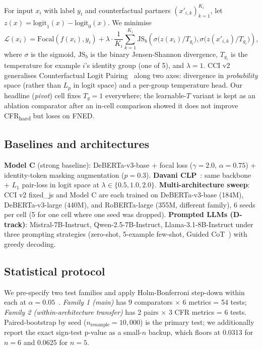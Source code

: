 \documentclass[10pt,a4paper]{article}
\begin{document}
For input $x_i$ with label $y_i$ and counterfactual partners $(x'_{i,k})_{k=1}^{K_i}$,
let $z(x) = \mathrm{logit}_1(x) - \mathrm{logit}_0(x)$. We minimise
\[
\mathcal{L}(x_i)=\text{Focal}(f(x_i), y_i)
+\lambda\cdot\frac{1}{K_i}\sum_{k=1}^{K_i}
\mathrm{JS}_b\!\left(\sigma\!\bigl(z(x_i)/T_{g_i}\bigr),
                     \sigma\!\bigl(z(x'_{i,k})/T_{g_i}\bigr)\right),
\]
where $\sigma$ is the sigmoid, $\mathrm{JS}_b$ is the binary Jensen-Shannon
divergence, $T_{g_i}$ is the temperature for example $i$'s identity group
(one of 5), and $\lambda{=}1$. CCI v2 generalises Counterfactual Logit
Pairing~\citep{garg2019counterfactual,davani2021improving} along two axes:
divergence in \emph{probability} space (rather than $L_p$ in logit space)
and a per-group temperature head. Our headline (\emph{pivot}) cell fixes
$T_g{=}1$ everywhere; the learnable-$T$ variant is kept as an ablation
comparator after an in-cell comparison showed it does not improve
CFR\textsubscript{hard} but loses on FNED.

\subsection{Baselines and architectures}

\textbf{Model C} (strong baseline): DeBERTa-v3-base + focal loss
($\gamma{=}2.0,\,\alpha{=}0.75$) + identity-token masking augmentation
($p{=}0.3$). \textbf{Davani CLP}~\citep{davani2021improving}: same backbone
+ $L_1$ pair-loss in logit space at $\lambda\in\{0.5, 1.0, 2.0\}$.
\textbf{Multi-architecture sweep}: CCI v2 fixed\_js and Model C are each
trained on DeBERTa-v3-base (184M), DeBERTa-v3-large (440M), and RoBERTa-large
(355M, different family), 6 seeds per cell (5 for one cell where one seed
was dropped). \textbf{Prompted LLMs (D-track)}: Mistral-7B-Instruct,
Qwen-2.5-7B-Instruct, Llama-3.1-8B-Instruct under three prompting strategies
(zero-shot, 5-example few-shot, Guided CoT~\citep{patel2025evaluating}) with
greedy decoding.

\subsection{Statistical protocol}

We pre-specify two test families and apply Holm-Bonferroni step-down within
each at $\alpha{=}0.05$~\citep{dror2018hitchhiker}. \emph{Family 1 (main)}
has 9 comparators $\times$ 6 metrics = 54 tests; \emph{Family 2
(within-architecture transfer)} has 2 pairs $\times$ 3 CFR metrics = 6 tests.
Paired-bootstrap by seed ($n_{\text{resample}}{=}10{,}000$) is the primary
test; we additionally report the exact sign-test p-value as a small-$n$
backup, which floors at 0.0313 for $n{=}6$ and 0.0625 for $n{=}5$.
\end{document}
